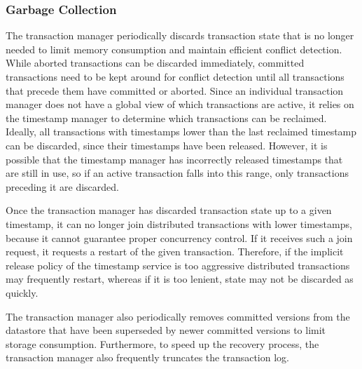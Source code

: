 \documentclass[10pt,final,journal]{IEEEtran}
\begin{document}
\subsubsection{Garbage Collection}
The transaction manager periodically discards transaction state that is no longer needed to limit memory consumption and maintain efficient conflict detection. While aborted transactions can be discarded immediately, committed transactions need to be kept around for conflict detection until all transactions that precede them have committed or aborted. Since an individual transaction manager does not have a global view of which transactions are active, it relies on the timestamp manager to determine which transactions can be reclaimed. Ideally, all transactions with timestamps lower than the last reclaimed timestamp can be discarded, since their timestamps have been released. However, it is possible that the timestamp manager has incorrectly released timestamps that are still in use, so if an active transaction falls into this range, only transactions preceding it are discarded.

Once the transaction manager has discarded transaction state up to a given timestamp, it can no longer join distributed transactions with lower timestamps, because it cannot guarantee proper concurrency control. If it receives such a join request, it requests a restart of the given transaction. Therefore, if the implicit release policy of the timestamp service is too aggressive distributed transactions may frequently restart, whereas if it is too lenient, state may not be discarded as quickly.

The transaction manager also periodically removes committed versions from the datastore that have been superseded by newer committed versions to limit storage consumption. Furthermore, to speed up the recovery process, the transaction manager also frequently truncates the transaction log.
\end{document}
